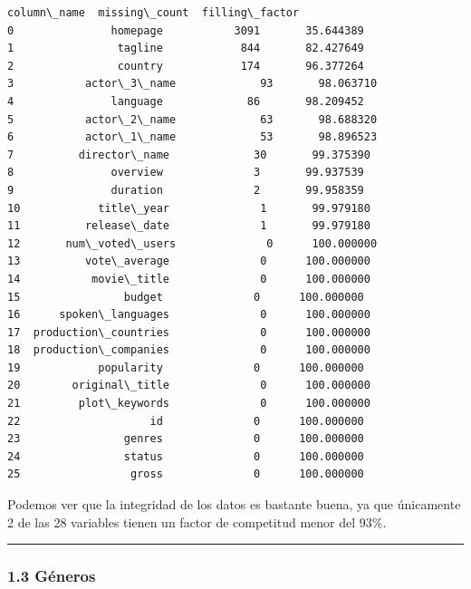             \begin{tcolorbox}[breakable, boxrule=.5pt, size=fbox, pad at break*=1mm, opacityfill=0]
\begin{Verbatim}[commandchars=\\\{\}]
             column\_name  missing\_count  filling\_factor
0               homepage           3091       35.644389
1                tagline            844       82.427649
2                country            174       96.377264
3           actor\_3\_name             93       98.063710
4               language             86       98.209452
5           actor\_2\_name             63       98.688320
6           actor\_1\_name             53       98.896523
7          director\_name             30       99.375390
8               overview              3       99.937539
9               duration              2       99.958359
10            title\_year              1       99.979180
11          release\_date              1       99.979180
12       num\_voted\_users              0      100.000000
13          vote\_average              0      100.000000
14           movie\_title              0      100.000000
15                budget              0      100.000000
16      spoken\_languages              0      100.000000
17  production\_countries              0      100.000000
18  production\_companies              0      100.000000
19            popularity              0      100.000000
20        original\_title              0      100.000000
21         plot\_keywords              0      100.000000
22                    id              0      100.000000
23                genres              0      100.000000
24                status              0      100.000000
25                 gross              0      100.000000
\end{Verbatim}
\end{tcolorbox}
        
    Podemos ver que la integridad de los datos es bastante buena, ya que
únicamente 2 de las 28 variables tienen un factor de competitud menor
del 93\%.

    \begin{center}\rule{0.5\linewidth}{\linethickness}\end{center}

\subsubsection{1.3 Géneros}\label{guxe9neros}

